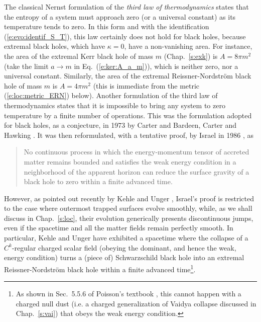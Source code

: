 The classical Nernst formulation of the \emph{third law of thermodynamics}
states that the entropy of a system must approach zero (or a universal constant)
as its temperature tends to zero. In this form and with the identification (\ref{e:evo:identif_S_T}), this law certainly does not hold for black holes, because
extremal black holes, which have $\kappa=0$, have a non-vanishing area. For
instance, the area of the extremal Kerr black hole of mass $m$ (Chap.~\ref{s:exk}) is
$A = 8\pi m^2$ (take the limit $a\to m$ in Eq.~(\ref{e:ker:A_a_m})),
which is neither zero, nor a universal constant. Similarly, the area of
the extremal Reissner-Nordström black hole of mass $m$ is $A = 4\pi m^2$
(this is immediate from the metric (\ref{e:loc:metric_ERN}) below).
Another formulation of the third law of thermodynamics states that it is impossible to bring any
system to zero temperature by a finite number of operations. This was the formulation adopted
for black holes, as a conjecture, in 1973 by Carter \cite{Carte73b} and Bardeen, Carter and Hawking \cite{BardeCH73}.
It was then reformulated, with a tentative proof, by Israel in 1986 \cite{Israe86b}, as
\begin{quote}
No continuous process in which the energy-momentum tensor of accreted matter remains
bounded and satisfies the weak energy
condition in a neighborhood of the apparent
horizon can reduce the surface gravity of a black hole to zero
within a finite advanced time.
\end{quote}
However, as pointed out recently by Kehle and Unger \cite{KehleU23}, Israel's proof
is restricted to the case where outermost trapped surfaces evolve smoothly, while, as we shall discuss in Chap.~\ref{s:loc},
their evolution generically presents discontinuous jumps, even if the spacetime
and all the matter fields remain perfectly smooth. In particular, Kehle and Unger \cite{KehleU23} have exhibited
a spacetime where the collapse of a $C^k$-regular charged scalar field (obeying the dominant, and hence the weak, energy condition) turns a (piece of) Schwarzschild black hole
into an extremal Reissner-Nordström black hole within a finite advanced time\footnote{As shown
in Sec.~5.5.6 of Poisson's textbook \cite{Poiss04}, this cannot happen with a charged null dust
(i.e. a charged generalization of Vaidya collapse discussed in Chap.~\ref{s:vai}) that obeys
the weak energy condition.}.


